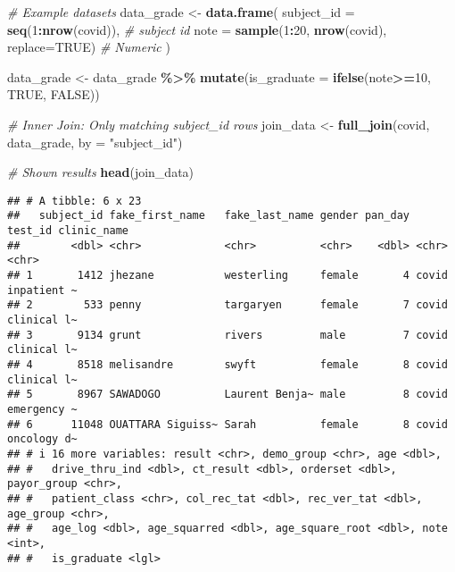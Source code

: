 \documentclass[
]{book}
\newenvironment{Shaded}{\begin{snugshade}}{\end{snugshade}}
\newcommand{\AttributeTok}[1]{\textcolor[rgb]{0.13,0.29,0.53}{#1}}
\newcommand{\CommentTok}[1]{\textcolor[rgb]{0.56,0.35,0.01}{\textit{#1}}}
\newcommand{\ConstantTok}[1]{\textcolor[rgb]{0.56,0.35,0.01}{#1}}
\newcommand{\DecValTok}[1]{\textcolor[rgb]{0.00,0.00,0.81}{#1}}
\newcommand{\FunctionTok}[1]{\textcolor[rgb]{0.13,0.29,0.53}{\textbf{#1}}}
\newcommand{\NormalTok}[1]{#1}
\newcommand{\OtherTok}[1]{\textcolor[rgb]{0.56,0.35,0.01}{#1}}
\newcommand{\SpecialCharTok}[1]{\textcolor[rgb]{0.81,0.36,0.00}{\textbf{#1}}}
\newcommand{\StringTok}[1]{\textcolor[rgb]{0.31,0.60,0.02}{#1}}
\begin{document}
\begin{Shaded}
\begin{Highlighting}[]
\CommentTok{\# Example datasets}
\NormalTok{data\_grade }\OtherTok{\textless{}{-}} \FunctionTok{data.frame}\NormalTok{(}
  \AttributeTok{subject\_id =} \FunctionTok{seq}\NormalTok{(}\DecValTok{1}\SpecialCharTok{:}\FunctionTok{nrow}\NormalTok{(covid)),    }\CommentTok{\# subject id}
  \AttributeTok{note =} \FunctionTok{sample}\NormalTok{(}\DecValTok{1}\SpecialCharTok{:}\DecValTok{20}\NormalTok{, }\FunctionTok{nrow}\NormalTok{(covid), }\AttributeTok{replace=}\ConstantTok{TRUE}\NormalTok{)                 }\CommentTok{\# Numeric }
\NormalTok{)}

\NormalTok{data\_grade }\OtherTok{\textless{}{-}}\NormalTok{ data\_grade }\SpecialCharTok{\%\textgreater{}\%} 
  \FunctionTok{mutate}\NormalTok{(}\AttributeTok{is\_graduate =} \FunctionTok{ifelse}\NormalTok{(note}\SpecialCharTok{\textgreater{}=}\DecValTok{10}\NormalTok{, }\ConstantTok{TRUE}\NormalTok{, }\ConstantTok{FALSE}\NormalTok{))}

\CommentTok{\# Inner Join: Only matching subject\_id rows}
\NormalTok{join\_data }\OtherTok{\textless{}{-}} \FunctionTok{full\_join}\NormalTok{(covid, data\_grade, }\AttributeTok{by =} \StringTok{"subject\_id"}\NormalTok{)}

\CommentTok{\# Shown results}
\FunctionTok{head}\NormalTok{(join\_data)}
\end{Highlighting}
\end{Shaded}

\begin{verbatim}
## # A tibble: 6 x 23
##   subject_id fake_first_name   fake_last_name gender pan_day test_id clinic_name
##        <dbl> <chr>             <chr>          <chr>    <dbl> <chr>   <chr>      
## 1       1412 jhezane           westerling     female       4 covid   inpatient ~
## 2        533 penny             targaryen      female       7 covid   clinical l~
## 3       9134 grunt             rivers         male         7 covid   clinical l~
## 4       8518 melisandre        swyft          female       8 covid   clinical l~
## 5       8967 SAWADOGO          Laurent Benja~ male         8 covid   emergency ~
## 6      11048 OUATTARA Siguiss~ Sarah          female       8 covid   oncology d~
## # i 16 more variables: result <chr>, demo_group <chr>, age <dbl>,
## #   drive_thru_ind <dbl>, ct_result <dbl>, orderset <dbl>, payor_group <chr>,
## #   patient_class <chr>, col_rec_tat <dbl>, rec_ver_tat <dbl>, age_group <chr>,
## #   age_log <dbl>, age_squarred <dbl>, age_square_root <dbl>, note <int>,
## #   is_graduate <lgl>
\end{verbatim}
\end{document}
